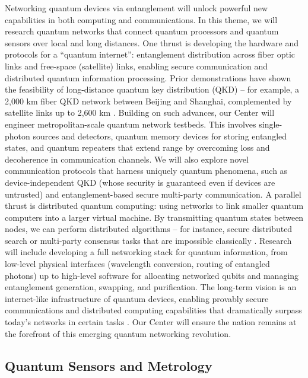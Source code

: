\documentclass[12pt]{article}
\begin{document}
Networking quantum devices via entanglement will unlock powerful new capabilities in both computing and communications. In this theme, we will research quantum networks that connect quantum processors and quantum sensors over local and long distances. One thrust is developing the hardware and protocols for a “quantum internet”: entanglement distribution across fiber optic links and free-space (satellite) links, enabling secure communication and distributed quantum information processing. Prior demonstrations have shown the feasibility of long-distance quantum key distribution (QKD) – for example, a 2,000 km fiber QKD network between Beijing and Shanghai, complemented by satellite links up to 2,600 km . Building on such advances, our Center will engineer metropolitan-scale quantum network testbeds. This involves single-photon sources and detectors, quantum memory devices for storing entangled states, and quantum repeaters that extend range by overcoming loss and decoherence in communication channels. We will also explore novel communication protocols that harness uniquely quantum phenomena, such as device-independent QKD (whose security is guaranteed even if devices are untrusted) and entanglement-based secure multi-party communication. A parallel thrust is distributed quantum computing: using networks to link smaller quantum computers into a larger virtual machine. By transmitting quantum states between nodes, we can perform distributed algorithms – for instance, secure distributed search or multi-party consensus tasks that are impossible classically . Research will include developing a full networking stack for quantum information, from low-level physical interfaces (wavelength conversion, routing of entangled photons) up to high-level software for allocating networked qubits and managing entanglement generation, swapping, and purification. The long-term vision is an internet-like infrastructure of quantum devices, enabling provably secure communications and distributed computing capabilities that dramatically surpass today’s networks in certain tasks . Our Center will ensure the nation remains at the forefront of this emerging quantum networking revolution.



\subsection{Quantum Sensors and Metrology}
\end{document}
